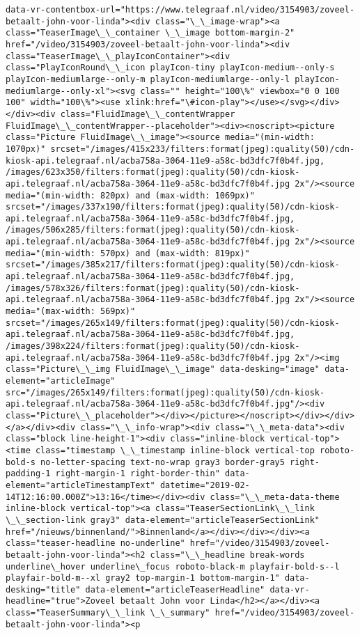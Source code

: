 \documentclass[11pt]{article}
\begin{document}
\begin{Verbatim}[commandchars=\\\{\}]
data-vr-contentbox-url="https://www.telegraaf.nl/video/3154903/zoveel-betaalt-john-voor-linda"><div class="\_\_image-wrap"><a class="TeaserImage\_\_container \_\_image bottom-margin-2" href="/video/3154903/zoveel-betaalt-john-voor-linda"><div class="TeaserImage\_\_playIconContainer"><div class="PlayIconRound\_\_icon playIcon-tiny playIcon-medium--only-s playIcon-mediumlarge--only-m playIcon-mediumlarge--only-l playIcon-mediumlarge--only-xl"><svg class="" height="100\%" viewbox="0 0 100 100" width="100\%"><use xlink:href="\#icon-play"></use></svg></div></div><div class="FluidImage\_\_contentWrapper FluidImage\_\_contentWrapper--placeholder"><div><noscript><picture class="Picture FluidImage\_\_image"><source media="(min-width: 1070px)" srcset="/images/415x233/filters:format(jpeg):quality(50)/cdn-kiosk-api.telegraaf.nl/acba758a-3064-11e9-a58c-bd3dfc7f0b4f.jpg, /images/623x350/filters:format(jpeg):quality(50)/cdn-kiosk-api.telegraaf.nl/acba758a-3064-11e9-a58c-bd3dfc7f0b4f.jpg 2x"/><source media="(min-width: 820px) and (max-width: 1069px)" srcset="/images/337x190/filters:format(jpeg):quality(50)/cdn-kiosk-api.telegraaf.nl/acba758a-3064-11e9-a58c-bd3dfc7f0b4f.jpg, /images/506x285/filters:format(jpeg):quality(50)/cdn-kiosk-api.telegraaf.nl/acba758a-3064-11e9-a58c-bd3dfc7f0b4f.jpg 2x"/><source media="(min-width: 570px) and (max-width: 819px)" srcset="/images/385x217/filters:format(jpeg):quality(50)/cdn-kiosk-api.telegraaf.nl/acba758a-3064-11e9-a58c-bd3dfc7f0b4f.jpg, /images/578x326/filters:format(jpeg):quality(50)/cdn-kiosk-api.telegraaf.nl/acba758a-3064-11e9-a58c-bd3dfc7f0b4f.jpg 2x"/><source media="(max-width: 569px)" srcset="/images/265x149/filters:format(jpeg):quality(50)/cdn-kiosk-api.telegraaf.nl/acba758a-3064-11e9-a58c-bd3dfc7f0b4f.jpg, /images/398x224/filters:format(jpeg):quality(50)/cdn-kiosk-api.telegraaf.nl/acba758a-3064-11e9-a58c-bd3dfc7f0b4f.jpg 2x"/><img class="Picture\_\_img FluidImage\_\_image" data-desking="image" data-element="articleImage" src="/images/265x149/filters:format(jpeg):quality(50)/cdn-kiosk-api.telegraaf.nl/acba758a-3064-11e9-a58c-bd3dfc7f0b4f.jpg"/><div class="Picture\_\_placeholder"></div></picture></noscript></div></div></a></div><div class="\_\_info-wrap"><div class="\_\_meta-data"><div class="block line-height-1"><div class="inline-block vertical-top"><time class="timestamp \_\_timestamp inline-block vertical-top roboto-bold-s no-letter-spacing text-no-wrap gray3 border-gray5 right-padding-1 right-margin-1 right-border-thin" data-element="articleTimestampText" datetime="2019-02-14T12:16:00.000Z">13:16</time></div><div class="\_\_meta-data-theme inline-block vertical-top"><a class="TeaserSectionLink\_\_link \_\_section-link gray3" data-element="articleTeaserSectionLink" href="/nieuws/binnenland/">Binnenland</a></div></div></div><a class="teaser-headline no-underline" href="/video/3154903/zoveel-betaalt-john-voor-linda"><h2 class="\_\_headline break-words underline\_hover underline\_focus roboto-black-m playfair-bold-s--l playfair-bold-m--xl gray2 top-margin-1 bottom-margin-1" data-desking="title" data-element="articleTeaserHeadline" data-vr-headline="true">Zoveel betaalt John voor Linda</h2></a></div><a class="TeaserSummary\_\_link \_\_summary" href="/video/3154903/zoveel-betaalt-john-voor-linda"><p 
\end{Verbatim}
\end{document}

